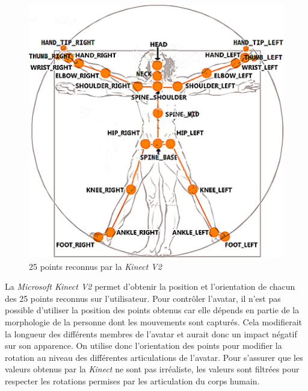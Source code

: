 \begin{figure}[!h]
   	\centerline{\includegraphics[scale=0.7]{images/kinectTracking}}
   	\caption{\label{track} 25 points reconnus par la \emph{Kinect V2} }
\end{figure}

La \emph{Microsoft Kinect V2} permet d'obtenir la position et l'orientation de chacun des 25 points reconnus sur l'utilisateur. Pour contrôler l'avatar, il n'est pas possible d'utiliser la position des points obtenus car elle dépends en partie de la morphologie de la personne dont les mouvements sont capturés. Cela modifierait la longueur des différents membres de l'avatar et aurait donc un impact négatif sur son apparence. On utilise donc l'orientation des points pour modifier la rotation au niveau des différentes articulations de l'avatar. Pour s'assurer que les valeurs obtenus par la \emph{Kinect} ne sont pas irréaliste, les valeurs sont filtrées pour respecter les rotations permises par les articulation du corps humain.\\

